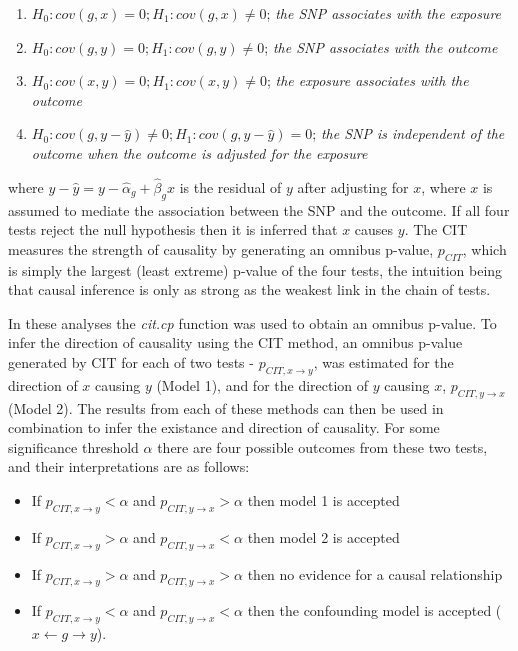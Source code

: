 \documentclass[]{article}
\providecommand{\tightlist}{%
  \setlength{\itemsep}{0pt}\setlength{\parskip}{0pt}}
\begin{document}
\begin{enumerate}
\def\labelenumi{\arabic{enumi}.}
\tightlist
\item
  \(H_0: cov(g, x) = 0; H_1: cov(g, x) \neq 0\); \emph{the SNP
  associates with the exposure}
\item
  \(H_0: cov(g, y) = 0; H_1: cov(g, y) \neq 0\); \emph{the SNP
  associates with the outcome}
\item
  \(H_0: cov(x, y) = 0; H_1: cov(x, y) \neq 0\); \emph{the exposure
  associates with the outcome}
\item
  \(H_0: cov(g, y - \hat{y}) \neq 0; H_1: cov(g, y - \hat{y}) = 0\);
  \emph{the SNP is independent of the outcome when the outcome is
  adjusted for the exposure}
\end{enumerate}

where \(y - \hat{y} = y - \hat{\alpha}_g + \hat{\beta}_g x\) is the
residual of \(y\) after adjusting for \(x\), where \(x\) is assumed to
mediate the association between the SNP and the outcome. If all four
tests reject the null hypothesis then it is inferred that \(x\) causes
\(y\). The CIT measures the strength of causality by generating an
omnibus p-value, \(p_{CIT}\), which is simply the largest (least
extreme) p-value of the four tests, the intuition being that causal
inference is only as strong as the weakest link in the chain of tests.

In these analyses the \emph{cit.cp} function was used to obtain an
omnibus p-value. To infer the direction of causality using the CIT
method, an omnibus p-value generated by CIT for each of two tests -
\(p_{CIT, x \rightarrow y}\), was estimated for the direction of \(x\)
causing \(y\) (Model 1), and for the direction of \(y\) causing \(x\),
\(p_{CIT, y \rightarrow x}\) (Model 2). The results from each of these
methods can then be used in combination to infer the existance and
direction of causality. For some significance threshold \(\alpha\) there
are four possible outcomes from these two tests, and their
interpretations are as follows:

\begin{itemize}
\tightlist
\item
  If \(p_{CIT, x \rightarrow y} < \alpha\) and
  \(p_{CIT, y \rightarrow x} > \alpha\) then model 1 is accepted
\item
  If \(p_{CIT, x \rightarrow y} > \alpha\) and
  \(p_{CIT, y \rightarrow x} < \alpha\) then model 2 is accepted
\item
  If \(p_{CIT, x \rightarrow y} > \alpha\) and
  \(p_{CIT, y \rightarrow x} > \alpha\) then no evidence for a causal
  relationship
\item
  If \(p_{CIT, x \rightarrow y} < \alpha\) and
  \(p_{CIT, y \rightarrow x} < \alpha\) then the confounding model is
  accepted (\(x \leftarrow g \rightarrow y\)).
\end{itemize}
\end{document}
